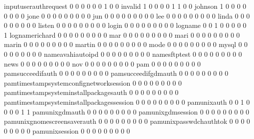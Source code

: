 \documentclass[compress,8pt]{beamer}
\begin{document}
\begin{frame}
\begin{Schunk}
  inputuserauthrequest                       0   0   0   0   0   0   1   0   0
  invalid                                    1   0   0   0   0   1   1   0   0
  johnson                                    1   0   0   0   0   0   0   0   0
  jone                                       0   0   0   0   0   0   0   0   0
  jun                                        0   0   0   0   0   0   0   0   0
  lee                                        0   0   0   0   0   0   0   0   0
  linda                                      0   0   0   0   0   0   0   0   0
  listen                                     0   0   0   0   0   0   0   0   0
  login                                      0   0   0   0   0   0   0   0   0
  logname                                    0   0   1   0   0   0   0   0   1
  lognamerichard                             0   0   0   0   0   0   0   0   0
  mar                                        0   0   0   0   0   0   0   0   0
  mari                                       0   0   0   0   0   0   0   0   0
  marin                                      0   0   0   0   0   0   0   0   0
  martin                                     0   0   0   0   0   0   0   0   0
  mode                                       0   0   0   0   0   0   0   0   0
  mysql                                      0   0   0   0   0   0   0   0   0
  nameavahiautoipd                           0   0   0   0   0   0   0   0   0
  namesftptest                               0   0   0   0   0   0   0   0   0
  news                                       0   0   0   0   0   0   0   0   0
  nov                                        0   0   0   0   0   0   0   0   0
  pam                                        0   0   0   0   0   0   0   0   0
  pamsucceedifauth                           0   0   0   0   0   0   0   0   0
  pamsucceedifgdmauth                        0   0   0   0   0   0   0   0   0
  pamtimestampsystemconfignetworksession     0   0   0   0   0   0   0   0   0
  pamtimestampsysteminstallpackagesauth      0   0   0   0   0   0   0   0   0
  pamtimestampsysteminstallpackagessession   0   0   0   0   0   0   0   0   0
  pamunixauth                                0   0   1   0   0   0   0   1   1
  pamunixgdmauth                             0   0   0   0   0   0   0   0   0
  pamunixgdmsession                          0   0   0   0   0   0   0   0   0
  pamunixgnomescreensaverauth                0   0   0   0   0   0   0   0   0
  pamunixpasswdchauthtok                     0   0   0   0   0   0   0   0   0
  pamunixsession                             0   0   0   0   0   0   0   0   0

\end{Schunk}
\end{frame}
\end{document}
